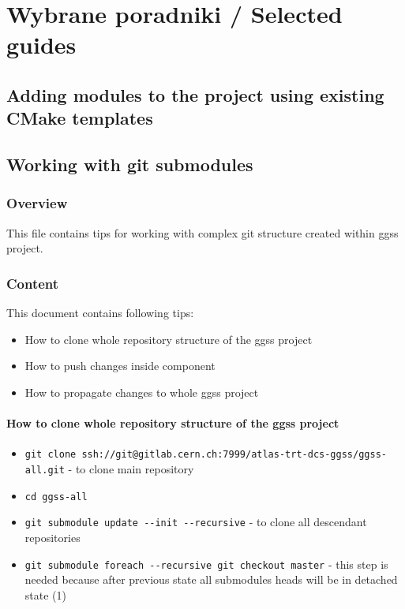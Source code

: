\chapter{Wybrane poradniki / Selected guides} %
\label{cha:howtos}


\section{Adding modules to the project using existing CMake templates}

\clearpage
\section{Working with git submodules}
\label{sec:working-with-git-sudmobules}

\subsection*{Overview}
This file contains tips for working with complex git structure created within ggss project.

\subsection*{Content}
This document contains following tips:
\begin{itemize}
    \item How to clone whole repository structure of the ggss project
    \item How to push changes inside component
    \item How to propagate changes to whole ggss project
\end{itemize}

\subsubsection*{How to clone whole repository structure of the ggss project}
\begin{itemize}
    \item \lstinline{git clone ssh://git@gitlab.cern.ch:7999/atlas-trt-dcs-ggss/ggss-all.git} - to clone main repository
    \item \lstinline{cd ggss-all}
    \item \lstinline{git submodule update --init --recursive} - to clone all descendant repositories
    \item \lstinline{git submodule foreach --recursive git checkout master} - this step is needed because after previous state all submodules heads will be in detached state (1)
\end{itemize}

